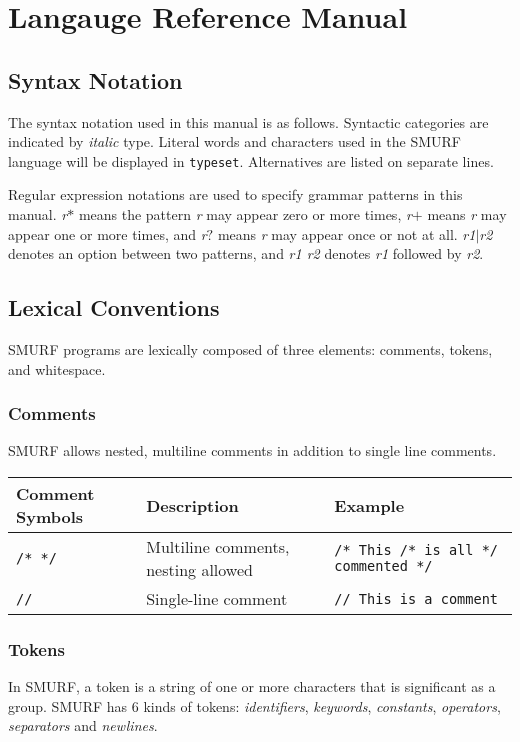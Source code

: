 \section{Langauge Reference Manual}

\subsection{Syntax Notation}
The syntax notation used in this manual is as follows. Syntactic 
categories are indicated by \emph{italic} type. Literal words and 
characters used in the SMURF language will be displayed in \texttt{typeset}. 
Alternatives are listed on separate lines. 

Regular expression notations are used to specify grammar patterns in this
manual.  {\it r}$*$ means the pattern {\it r} may appear zero or more times,
{\it r}$+$ means {\it r} may appear one or more times, and {\it r}$?$
means {\it r} may appear once or not at all. {\it r1}$|${\it r2} denotes an option
between two patterns, and {\it r1 r2} denotes {\it r1} followed by
{\it r2}. 

\subsection{Lexical Conventions}
SMURF programs are lexically composed of three elements: comments, tokens, and whitespace.

\subsubsection{Comments}
SMURF allows nested, multiline comments in addition to single line comments.
\begin{table} [H]
\centering
\begin{tabularx}{\textwidth}{lXl}
\hline\hline
Comment Symbols & Description & Example \\
\hline\hline
  \texttt{/* */} & Multiline comments, nesting allowed & \texttt{/* This /* is all */ commented */} \\ \hline
  \texttt{//} & Single-line comment & \texttt{// This is a comment} \\ \hline
\end{tabularx}
\end{table}


\subsubsection{Tokens}
In SMURF, a token is a string of one or more characters that is significant as a group.
SMURF has 6 kinds of tokens: {\it identifiers}, {\it keywords}, {\it constants},
      {\it operators},
{\it separators} and {\it newlines}.

